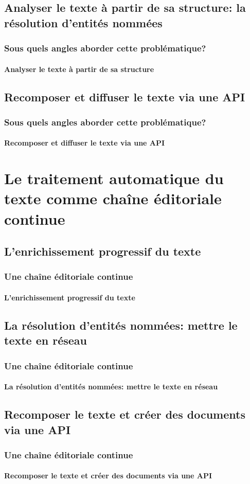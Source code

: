 \documentclass{beamer}
\begin{document}
\subsection{Analyser le texte à partir de sa structure: la résolution d'entités nommées}
\begin{frame}
	\frametitle{Sous quels angles aborder cette problématique?}
	\framesubtitle{Analyser le texte à partir de sa structure}
	
\end{frame}

\subsection{Recomposer et diffuser le texte via une API}
\begin{frame}
	\frametitle{Sous quels angles aborder cette problématique?}
	\framesubtitle{Recomposer et diffuser le texte via une API}
	
\end{frame}


\section{Le traitement automatique du texte comme chaîne éditoriale continue}
\subsection{L'enrichissement progressif du texte}
\begin{frame}
	\frametitle{Une chaîne éditoriale continue}
	\framesubtitle{L'enrichissement progressif du texte}
	
\end{frame}

\subsection{La résolution d'entités nommées: mettre le texte en réseau}
\begin{frame}
	\frametitle{Une chaîne éditoriale continue}
	\framesubtitle{La résolution d'entités nommées: mettre le texte en réseau}
	
\end{frame}

\subsection{Recomposer le texte et créer des documents via une API}
\begin{frame}
	\frametitle{Une chaîne éditoriale continue}
	\framesubtitle{Recomposer le texte et créer des documents via une API}
	
\end{frame}
\end{document}
